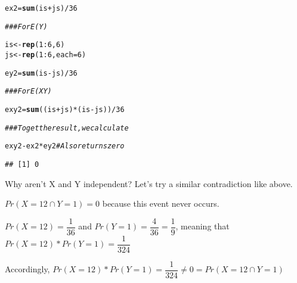 \documentclass[12pt,letter]{article}\usepackage[]{graphicx}\usepackage[]{color}
\makeatletter
\newcommand{\hlnum}[1]{\textcolor[rgb]{0.686,0.059,0.569}{#1}}%
\newcommand{\hlcom}[1]{\textcolor[rgb]{0.678,0.584,0.686}{\textit{#1}}}%
\newcommand{\hlopt}[1]{\textcolor[rgb]{0,0,0}{#1}}%
\newcommand{\hlstd}[1]{\textcolor[rgb]{0.345,0.345,0.345}{#1}}%
\newcommand{\hlkwb}[1]{\textcolor[rgb]{0.69,0.353,0.396}{#1}}%
\newcommand{\hlkwc}[1]{\textcolor[rgb]{0.333,0.667,0.333}{#1}}%
\newcommand{\hlkwd}[1]{\textcolor[rgb]{0.737,0.353,0.396}{\textbf{#1}}}%
\newenvironment{kframe}{%
 \def\at@end@of@kframe{}%
 \ifinner\ifhmode%
  \def\at@end@of@kframe{\end{minipage}}%
  \begin{minipage}{\columnwidth}%
 \fi\fi%
 \def\FrameCommand##1{\hskip\@totalleftmargin \hskip-\fboxsep
 \colorbox{shadecolor}{##1}\hskip-\fboxsep
     \hskip-\linewidth \hskip-\@totalleftmargin \hskip\columnwidth}%
 \MakeFramed {\advance\hsize-\width
   \@totalleftmargin\z@ \linewidth\hsize
   \@setminipage}}%
 {\par\unskip\endMakeFramed%
 \at@end@of@kframe}
\newenvironment{knitrout}{}{} %
\makeatother
\begin{document}
\begin{knitrout}
\begin{kframe}
\begin{alltt}
\hlstd{ex2} \hlkwb{=} \hlkwd{sum}\hlstd{(is} \hlopt{+} \hlstd{js)}\hlopt{/}\hlnum{36}

\hlcom{### For E(Y)}

\hlstd{is} \hlkwb{<-} \hlkwd{rep}\hlstd{(}\hlnum{1}\hlopt{:}\hlnum{6}\hlstd{,} \hlnum{6}\hlstd{)}
\hlstd{js} \hlkwb{<-} \hlkwd{rep}\hlstd{(}\hlnum{1}\hlopt{:}\hlnum{6}\hlstd{,} \hlkwc{each} \hlstd{=} \hlnum{6}\hlstd{)}

\hlstd{ey2} \hlkwb{=} \hlkwd{sum}\hlstd{(is} \hlopt{-} \hlstd{js)}\hlopt{/}\hlnum{36}

\hlcom{### For E(XY)}

\hlstd{exy2} \hlkwb{=} \hlkwd{sum}\hlstd{((is} \hlopt{+} \hlstd{js)} \hlopt{*} \hlstd{(is} \hlopt{-} \hlstd{js))}\hlopt{/}\hlnum{36}

\hlcom{### To get the result, we calculate}

\hlstd{exy2} \hlopt{-} \hlstd{ex2} \hlopt{*} \hlstd{ey2}  \hlcom{# Also returns zero}
\end{alltt}
\begin{verbatim}
## [1] 0
\end{verbatim}
\end{kframe}
\end{knitrout}

Why aren't X and Y independent? Let's try a similar contradiction like above.

$Pr (X=12 \cap Y=1) = 0$ because this event never occurs.

$Pr (X=12) = \dfrac{1}{36}$ and $Pr (Y=1) = \dfrac{4}{36} = \dfrac{1}{9}$, meaning that $Pr (X=12)*Pr(Y=1) = \dfrac{1}{324}$

Accordingly, $Pr (X=12)*Pr(Y=1) = \dfrac{1}{324} \neq 0 = Pr (X=12 \cap Y=1)$
\end{document}
